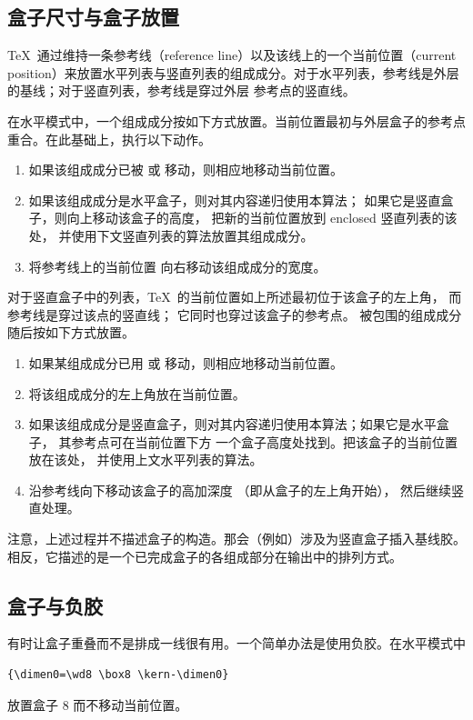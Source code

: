 \documentclass[a4paper]{rapport3}
\begin{document}
\subsection{盒子尺寸与盒子放置}

\TeX\ 通过维持一条参考线（reference line）以及该线上的一个当前位置（current position）来放置水平列表与竖直列表的组成成分。对于水平列表，参考线是外层  的基线；对于竖直列表，参考线是穿过外层  参考点的竖直线。

在水平模式中，一个组成成分按如下方式放置。当前位置最初与外层盒子的参考点重合。在此基础上，执行以下动作。
\begin{enumerate} \item 如果该组成成分已被  或  移动，则相应地移动当前位置。
\item 如果该组成成分是水平盒子，则对其内容递归使用本算法；
如果它是竖直盒子，则向上移动该盒子的高度，
把新的当前位置放到 enclosed 竖直列表的该处，
并使用下文竖直列表的算法放置其组成成分。
\item 将参考线上的当前位置
向右移动该组成成分的宽度。
\end{enumerate}

对于竖直盒子中的列表，\TeX\ 的当前位置如上所述最初位于该盒子的左上角，
而参考线是穿过该点的竖直线；
它同时也穿过该盒子的参考点。
被包围的组成成分随后按如下方式放置。
\begin{enumerate} \item 如果某组成成分已用  或  移动，则相应地移动当前位置。
\item 将该组成成分的左上角放在当前位置。
\item 如果该组成成分是竖直盒子，则对其内容递归使用本算法；如果它是水平盒子，
其参考点可在当前位置下方
一个盒子高度处找到。把该盒子的当前位置放在该处，
并使用上文水平列表的算法。
\item 沿参考线向下移动该盒子的高加深度
（即从盒子的左上角开始），
然后继续竖直处理。
\end{enumerate}
注意，上述过程并不描述盒子的构造。那会（例如）涉及为竖直盒子插入基线胶。相反，它描述的是一个已完成盒子的各组成部分在输出中的排列方式。

\subsection{盒子与负胶}

有时让盒子重叠而不是排成一线很有用。一个简单办法是使用负胶。在水平模式中
\begin{verbatim}
{\dimen0=\wd8 \box8 \kern-\dimen0}
\end{verbatim}
放置盒子 8 而不移动当前位置。
\end{document}
